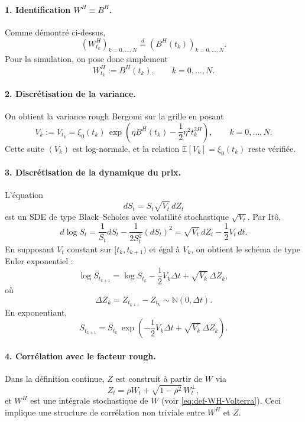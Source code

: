 \documentclass[11pt,a4paper]{article}
\newcommand{\N}{\mathbb{N}}
\newcommand{\E}{\mathbb{E}}
\newcommand{\1}{\mathbf{1}}
\newcommand{\bH}{B^{H}}
\begin{document}
\paragraph{1. Identification $W^H\equiv\bH$.}
Comme démontré ci-dessus,
\[
  (W_{t_k}^H)_{k=0,\dots,N}
  \stackrel{d}{=}
  (\bH(t_k))_{k=0,\dots,N}.
\]
Pour la simulation, on pose donc simplement
\begin{equation}
  W_{t_k}^H := \bH(t_k),\qquad k=0,\dots,N.
\end{equation}

\paragraph{2. Discrétisation de la variance.}
On obtient la variance rough Bergomi sur la grille en posant
\begin{equation}
  V_k := V_{t_k}
  = \xi_0(t_k)\,
    \exp\!\left(
      \eta \bH(t_k) - \frac12 \eta^2 t_k^{2H}
    \right),
  \qquad k=0,\dots,N.
\end{equation}
Cette suite $(V_k)$ est log-normale, et la relation
$\E[V_k]=\xi_0(t_k)$ reste vérifiée.

\paragraph{3. Discrétisation de la dynamique du prix.}
L'équation
\[
  dS_t = S_t \sqrt{V_t}\,dZ_t
\]
est un SDE de type Black--Scholes avec volatilité stochastique
$\sqrt{V_t}$. Par Itô,
\begin{equation}
  d\log S_t
  = \frac{1}{S_t}dS_t - \frac{1}{2S_t^2}(dS_t)^2
  = \sqrt{V_t}\,dZ_t - \frac12 V_t\,dt.
\end{equation}
En supposant $V_t$ constant sur $[t_k,t_{k+1})$ et égal à $V_k$,
on obtient le schéma de type Euler exponentiel :
\begin{equation}
  \log S_{t_{k+1}}
  = \log S_{t_k}
    - \frac12 V_k \Delta t
    + \sqrt{V_k}\,\Delta Z_k,
\end{equation}
où
\[
  \Delta Z_k = Z_{t_{k+1}} - Z_{t_k} \sim \N(0,\Delta t).
\]
En exponentiant,
\begin{equation}
  S_{t_{k+1}}
  = S_{t_k}\,
    \exp\!\left(
      -\frac12 V_k \Delta t
      + \sqrt{V_k}\,\Delta Z_k
    \right).
\end{equation}

\paragraph{4. Corrélation avec le facteur rough.}
Dans la définition continue, $Z$ est construit à partir de $W$ via
\[
  Z_t = \rho W_t + \sqrt{1-\rho^2}\,W_t^\perp,
\]
et $W^H$ est une intégrale stochastique de $W$ (voir
\eqref{eq:def-WH-Volterra}). Ceci implique une structure de
corrélation non triviale entre $W^H$ et $Z$.
\end{document}
